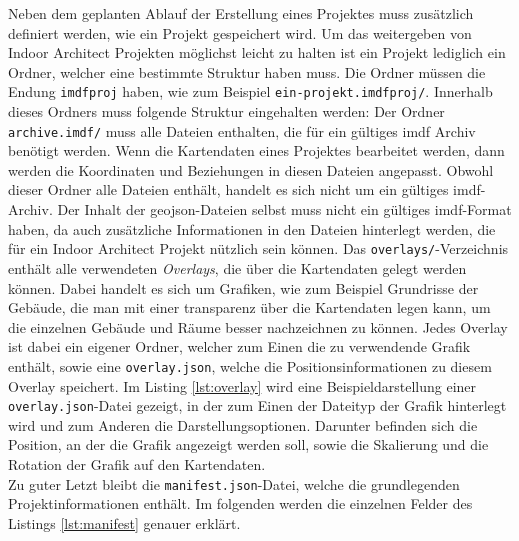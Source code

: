 Neben dem geplanten Ablauf der Erstellung eines Projektes muss zusätzlich definiert werden, wie ein Projekt gespeichert wird.
Um das weitergeben von Indoor Architect Projekten möglichst leicht zu halten ist ein Projekt lediglich ein Ordner, welcher eine bestimmte Struktur haben muss.
Die Ordner müssen die Endung \texttt{imdfproj} haben, wie zum Beispiel \texttt{ein-projekt.imdfproj/}.
Innerhalb dieses Ordners muss folgende Struktur eingehalten werden:
\vspace{5pt}
\vspace{5pt}
Der Ordner \texttt{archive.imdf/} muss alle Dateien enthalten, die für ein gültiges \acl{imdf} Archiv benötigt werden.
Wenn die Kartendaten eines Projektes bearbeitet werden, dann werden die Koordinaten und Beziehungen in diesen Dateien angepasst.
Obwohl dieser Ordner alle Dateien enthält, handelt es sich nicht um ein gültiges \ac{imdf}-Archiv.
Der Inhalt der \ac{geojson}-Dateien selbst muss nicht ein gültiges \ac{imdf}-Format haben, da auch zusätzliche Informationen in den Dateien hinterlegt werden, die für ein Indoor Architect Projekt nützlich sein können.\pbreak%
%
Das \texttt{overlays/}-Verzeichnis enthält alle verwendeten \emph{Overlays}, die über die Kartendaten gelegt werden können.
Dabei handelt es sich um Grafiken, wie zum Beispiel Grundrisse der Gebäude, die man mit einer transparenz über die Kartendaten legen kann, um die einzelnen Gebäude und Räume besser nachzeichnen zu können.
Jedes Overlay ist dabei ein eigener Ordner, welcher zum Einen die zu verwendende Grafik enthält, sowie eine \texttt{overlay.json}, welche die Positionsinformationen zu diesem Overlay speichert.
Im Listing \ref{lst:overlay} wird eine Beispieldarstellung einer \texttt{overlay.json}-Datei gezeigt, in der zum Einen der Dateityp der Grafik hinterlegt wird und zum Anderen die Darstellungsoptionen.
Darunter befinden sich die Position, an der die Grafik angezeigt werden soll, sowie die Skalierung und die Rotation der Grafik auf den Kartendaten.
\\
Zu guter Letzt bleibt die \texttt{manifest.json}-Datei, welche die grundlegenden Projektinformationen enthält.
Im folgenden werden die einzelnen Felder des Listings \ref{lst:manifest} genauer erklärt.
\\
